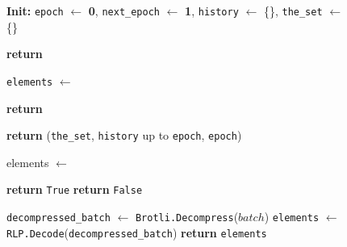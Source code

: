 \begin{figure}[t!]
  \begin{adjustbox}{minipage=[t]{\columnwidth}}
    \begin{algorithm}[H]
      \renewcommand{\thealgorithm}{ABCI Compresschain}         
      \caption{\small }%
      \label{alg:abci-brotli}%
      \small
      \begin{algorithmic}[1]
            \State \textbf{Init:} \texttt{epoch} $\leftarrow$ \textbf{0}, \texttt{next\_epoch} $\leftarrow$ \textbf{1}, \texttt{history} $\leftarrow$ \{\}, \texttt{the\_set} $\leftarrow$ \{\}

            \label{alg:brotli_check_tx}
                \State \textbf{return} 
            \EndFunction
      
            \label{alg:brotli_deliver_tx}
                \State \texttt{elements} $\leftarrow$ 
                \State {}
            		
            		\State \textbf{return}
            \EndFunction

            \label{alg:van_query}
                \State \textbf{return} (\texttt{the\_set}, \texttt{history} up to \texttt{epoch}, \texttt{epoch})            
             \EndFunction
            
            \label{alg:brotli_is_valid}
            		\State elements $\leftarrow$ 

                    		\State \textbf{return} \texttt{True}
                    \EndIf
                \EndFor
                \State \textbf{return} \texttt{False}
            \EndFunction
            
            \label{alg:brotli_get_element}
                \State \texttt{decompressed\_batch} $\leftarrow$ \texttt{Brotli.Decompress}($batch$)
                \State \texttt{elements} $\leftarrow$ \texttt{RLP.Decode}(\texttt{decompressed\_batch})
                \State \textbf{return} \texttt{elements}
            \EndFunction
            

\end{algorithmic}
\end{algorithm}
\end{adjustbox}
\end{figure}
